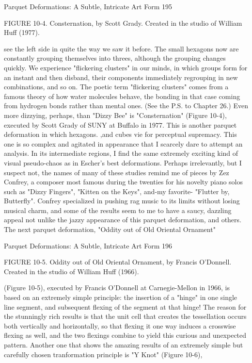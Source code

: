 Parquet Deformations: A Subtle, Intricate Art Form                                     195

FIGURE 10-4. Consternation, by Scott Grady. Created in the studio of William Huff
(1977).

see the left side in quite the way we saw it before. The small hexagons now are constantly
grouping themselves into threes, although the grouping changes quickly. We experience
"flickering clusters" in our minds, in which groups form for an instant and then disband,
their components immediately regrouping in new combinations, and so on. The poetic
term "flickering clusters" comes from a famous theory of how water molecules behave,
the bonding in that case coming from hydrogen bonds rather than mental ones. (See the
P.S. to Chapter 26.)
        Even more dizzying, perhaps, than "Dizzy Bee" is "Consternation" (Figure 10-4),
executed by Scott Grady of SUNY at Buffalo in 1977. This is another parquet
deformation in which hexagons. ,and cubes vie for perceptual supremacy. This one is so
complex and agitated in appearance that I scarcely dare to attempt an analysis. In its
intermediate regions, I find the same extremely exciting kind of visual pseudo-chaos as in
Escher's best deformations.
        Perhaps irrelevantly, but I suspect not, the names of many of these studies remind
me of pieces by Zez Confrey, a composer most famous during the twenties for his
novelty piano solos such as "Dizzy Fingers", "Kitten on the Keys", and-my favorite-
"Flutter by, Butterfly". Confrey specialized in pushing rag music to its limits without
losing musical charm, and some of the results seem to me to have a saucy, dazzling
appeal not unlike the jazzy appearance of this parquet deformation, and others.
        The next parquet deformation, "Oddity out of Old Oriental Ornament"




Parquet Deformations: A Subtle, Intricate Art Form                                    196

FIGURE 10-5. Oddity out of Old Oriental Ornament, by Francis O'Donnell. Created in
the studio of William Huff (1966).

(Figure 10-5), executed by Francis O'Donnell at Carnegie-Mellon in 1966, is based on an
extremely simple principle: the insertion of a "hinge" in one single line segment, and
subsequent flexing of the segment at that hinge! The reason for the stunningly rich results
is that the unit cell that creates the tessellation occurs both vertically and horizontally, so
that flexing it one way induces a crosswise flexing as well, and the two flexings combine
to yield this curious and unexpected pattern.
         Another one that shows the amazing results of an extremely simple but carefully
chosen tranformation principle is "Y Knot" (Figure 10-6),




